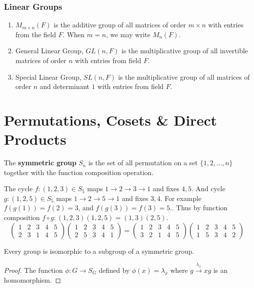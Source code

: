 \subsubsection{Linear Groups}
\begin{enumerate}
	\item $M_{m \times n}(F)$ is the additive group of all matrices of order $m \times n$ with entries from the field $F$.
	When $m=n$, we may write $M_n(F)$.
	\item General Linear Group, $GL(n,F)$ is the multiplicative group of all invertible matrices of order $n$ with entries from field $F$.
	\item Special Linear Group, $SL(n,F)$ is the multiplicative group of all matrices of order $n$ and determinant $1$ with entries from field $F$.
\end{enumerate}

\section{Permutations, Cosets \& Direct Products}
\begin{definition}
	The \textbf{symmetric group} $S_n$ is the set of all permutation on a set $\{1,2,\dots,n\}$ together with the function composition operation.
\end{definition}

	The cycle $f: (1,2,3) \in S_5$ maps $1 \to 2 \to 3 \to 1$ and fixes $4,5$. And cycle $g:(1,2,5) \in S_5$ maps $1 \to 2 \to 5 \to 1$ and fixes $3,4$.
	For example $f(g(1)) = f(2) = 3$, and $f(g(3)) = f(3) = 5$..
	Thus by function composition $f \circ g : (1,2,3)(1,2,5) = (1,3)(2,5)$.
	$$ \begin{pmatrix} 1 & 2 & 3 & 4 & 5 \\ 2 & 3 & 1 & 4 & 5 \end{pmatrix} \begin{pmatrix} 1 & 2 & 3 & 4 & 5 \\ 2 & 5 & 3 & 4 & 1 \end{pmatrix} = \begin{pmatrix} 1 & 2 & 3 & 4 & 5 \\ 3 & 2 & 1 & 4 & 5 \end{pmatrix} \begin{pmatrix} 1 & 2 & 3 & 4 & 5 \\ 1 & 5 & 3 & 4 & 2 \end{pmatrix}$$

\begin{theorem}[Cayley]
	Every group is isomorphic to a subgroup of a symmetric group.
\end{theorem}
\begin{proof}
	The function $\phi : G \to S_G$ defined by $\phi(x) = \lambda_x$ where $g \overset{\lambda_x}{\to} xg$ is an homomorphism.
\end{proof}

